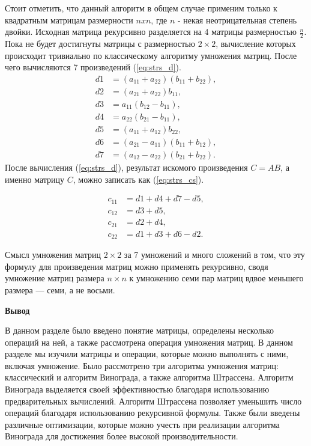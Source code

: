 Стоит отметить, что данный алгоритм в общем случае применим только к квадратным матрицам размерности $nxn$, где $n$ - некая неотрицательная степень двойки.
Исходная матрица рекурсивно разделяется на 4 матрицы размерностью $\frac{n}{2}$.
Пока не будет достигнуты матрицы с размерностью $2\times2$, вычисление которых происходит тривиально по классическому алгоритму умножения матриц. После чего вычисляются 7 произведений (\ref{eq:strs_d}).
\begin{equation}
	\label{eq:strs_d}
	\begin{aligned}
		d1 & = (a_{11} + a_{22})(b_{11}+b_{22}), \\
		d2 & = (a_{21} + a_{22})b_{11}, \\
		d3 & = a_{11}(b_{12}-b_{11}), \\
		d4 & = a_{22}(b_{21} - b_{11}),\\
		d5 & = (a_{11}+a_{12})b_{22}, \\
		d6 & = (a_{21} - a_{11})(b_{11} + b_{12}), \\
		d7 & = (a_{12} - a_{22})(b_{21} + b_{22}).
	\end{aligned}
\end{equation}
После вычисления (\ref{eq:strs_d}), результат искомого произведения $C=AB$, а именно
матрицу $C$, можно записать как (\ref{eq:strs_cs}).


\begin{equation}
	\label{eq:strs_cs}
	\begin{aligned}
		c_{11} & = d1 + d4 + d7 -d5, \\
		c_{12} & = d3 + d5, \\
		c_{21} & = d2 + d4, \\
		c_{22} & = d1 + d3 + d6 -d2.
	\end{aligned}
\end{equation}

Смысл умножения матриц $2\times2$ за 7 умножений и много сложений в том, что эту формулу для произведения
матриц можно применять рекурсивно, сводя умножение матриц размера $n\times n$ к умножению
семи пар матриц вдвое меньшего размера — семи, а не восьми.




\textbf{Вывод}

В данном разделе было введено понятие матрицы, определены несколько операций на ней, 
а также рассмотрена операция умножения матриц.
В данном разделе мы изучили матрицы и операции, 
которые можно выполнять с ними, включая умножение. 
Было рассмотрено три алгоритма умножения матриц: классический и алгоритм Винограда, а также алгоритма Штрассена.
Алгоритм Винограда выделяется своей эффективностью благодаря использованию предварительных вычислений.
Алгоритм Штрассена позволяет уменьшить число операций благодаря использованию рекурсивной формулы.
Также были введены  различные оптимизации, которые можно учесть при реализации алгоритма Винограда для 
достижения более высокой производительности.